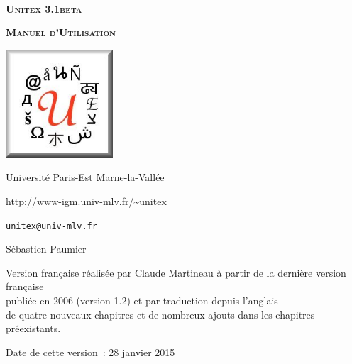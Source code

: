 
\begin{titlepage}
\begin{center}

~

\vspace{3cm}
\Huge
\textsc{\textbf{Unitex 3.1beta}}

\vspace{1cm}

\huge
\textsc{\textbf{Manuel d'Utilisation}}

\vspace{2cm}

  \begin{center}
    \includegraphics[width=4cm]{resources/img/logo-Unitex.png}
  \end{center}
\normalsize

\vspace{2cm}

\LARGE

Université Paris-Est Marne-la-Vallée
\bigskip
\normalsize

\url{http://www-igm.univ-mlv.fr/~unitex}

\verb$unitex@univ-mlv.fr$

\vspace{1cm}

Sébastien Paumier
\bigskip

Version française réalisée par Claude Martineau à partir de la dernière version française\\
publiée en 2006 (version 1.2) et par traduction depuis l'anglais\\
de quatre nouveaux chapitres et de nombreux ajouts dans les chapitres préexistants.
\bigskip

Date de cette version~: 28 janvier 2015

\end{center}

\end{titlepage}
